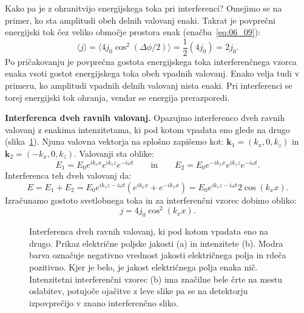 Kako pa je z ohranitvijo energijskega toka pri interferenci? Omejimo 
se na primer, ko sta amplitudi obeh delnih valovanj enaki. Takrat
je povprečni energijski  tok čez veliko območje prostora enak (enačba~\ref{eq:06_09}):
\begin{equation}
\langle j \rangle = \langle 4j_0 \cos^2 (\Delta \phi/2) \rangle  = \frac{1}{2}(4j_0) = 2j_0.
\label{eq:06_10}
\end{equation}
Po pričakovanju je povprečna gostota energijskega toka interferenčnega vzorca
enaka vsoti gostot energijskega toka obeh vpadnih valovanj. Enako velja tudi 
v primeru, ko amplitudi vpadnih delnih valovanj nista enaki. Pri interferenci se 
torej energijski tok ohranja, vendar se energija prerazporedi.

\begin{example}{\bf Interferenca dveh ravnih valovanj.}
Opazujmo interferenco dveh ravnih valovanj z enakima intenzitetama, ki pod kotom 
vpadata eno glede na drugo (slika~\ref{fig:06_int}). Njuna valovna vektorja na splošno
zapišemo kot: $\mathbf{k}_1 = (k_x,0, k_z)$ in $\mathbf{k}_2 = (-k_x,0, k_z)$. 
Valovanji sta oblike:
\begin{equation}
E_1 = E_0 e^{ik_x x} e^{ik_z z}e^{-i\omega t} \qquad \mathrm{in} \qquad 
E_2 = E_0 e^{-ik_x x} e^{ik_z z}e^{-i\omega t}.
\label{eq:06_12}
\end{equation}
Interferenca teh dveh valovanj da:
\begin{equation}
E = E_1+E_2 = E_0 e^{ik_z z -i\omega t }\left(e^{ik_x x}+e^{-ik_x x} \right) = 
E_0 e^{ik_z z -i\omega t } 2 \cos(k_x x).
\label{eq:06_14}
\end{equation}
Izračunamo gostoto svetlobnega toka in za interferenčni vzorec dobimo obliko:
\begin{equation}
j = 4 j_0 \cos^2(k_x x).
\label{eq:06_15}
\end{equation}
\begin{figure}[!ht]
\centering
\def\svgwidth{120truemm} 

\caption{Interferenca dveh ravnih valovanj, ki pod kotom vpadata eno na drugo. 
Prikaz električne poljske jakosti (a) in intenzitete (b). 
Modra barva označuje negativno vrednost jakosti električnega polja in 
rdeča pozitivno. Kjer je belo, je jakost električnega polja enaka nič.
Intenzitetni interferenčni vzorec (b)
ima značilne bele črte na mestu oslabitev, potujoče ojačitve z leve slike pa se 
na detektorju izpovprečijo v znano interferenčno sliko.}
\label{fig:06_int}
\end{figure}

\end{example}

